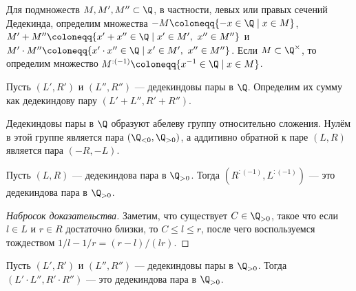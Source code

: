 \documentclass[
	extrafontsizes,
	11pt,
	hyphens,
]{memoir}
\begin{document}
\begin{definition}
Для подмножеств \(M, M', M'' \subset \Q\),
в частности, левых или правых сечений Дедекинда,
определим множества
\(-M \coloneqq \{-x \in \Q \mid x \in M\}\),
\(M' + M'' \coloneqq \{x' + x'' \in \Q \mid x' \in M',\ x'' \in M''\}\) и
\(M' \cdot M'' \coloneqq \{x' \cdot x'' \in \Q \mid x' \in M',\ x'' \in M''\}\).
Если \(M \subset \Q^\times\), то определим множество
\(M^{:(-1)} \coloneqq \{x^{-1} \in \Q \mid x \in M\}\).
\end{definition}

\begin{definition}
Пусть \((L',R')\) и \((L'',R'')\) --- дедекиндовы пары в \(\Q\).
Определим их сумму как дедекиндову пару
\((L' + L'', R' + R'')\).
\end{definition}

\begin{observation}
Дедекиндовы пары в \(\Q\) образуют абелеву группу относительно сложения.
\label{obs:DedPairAddGr}
Нулём в этой группе является пара
\((\Q_{<0}, \Q_{>0})\),
а аддитивно обратной к паре \((L,R)\) является пара \((-R,-L)\).
\end{observation}

\begin{lemma}
Пусть \((L,R)\) --- дедекиндова пара в \(\Q_{>0}\).
\label{lem:DedPairInv}
Тогда \((R^{:(-1)}, L^{:(-1)})\)
--- это дедекиндова пара в \(\Q_{>0}\).
\end{lemma}

\begin{proof}[Набросок доказательства]
Заметим, что существует \(C \in \Q_{>0}\), такое что если \(l \in L\) и \(r \in R\) достаточно близки, то \(C \leq l \leq r\),
после чего воспользуемся тождеством
\(1/l - 1/r = (r-l)/(lr)\).
\end{proof}

\begin{lemma}
\label{lem:DedPairProd}
Пусть \((L',R')\) и \((L'',R'')\) --- дедекиндовы пары в \(\Q_{>0}\).
Тогда \((L' \cdot L'', R' \cdot R'')\)
--- это дедекиндова пара в \(\Q_{>0}\).
\end{lemma}
\end{document}
